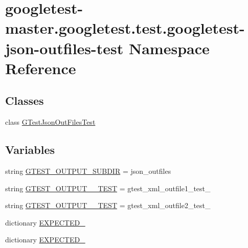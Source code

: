 \hypertarget{namespacegoogletest-master_1_1googletest_1_1test_1_1googletest-json-outfiles-test}{}\section{googletest-\/master.googletest.\+test.\+googletest-\/json-\/outfiles-\/test Namespace Reference}
\label{namespacegoogletest-master_1_1googletest_1_1test_1_1googletest-json-outfiles-test}
\subsection*{Classes}
\begin{DoxyCompactItemize}
\item 
class \mbox{\hyperlink{classgoogletest-master_1_1googletest_1_1test_1_1googletest-json-outfiles-test_1_1_g_test_json_out_files_test}{G\+Test\+Json\+Out\+Files\+Test}}
\end{DoxyCompactItemize}
\subsection*{Variables}
\begin{DoxyCompactItemize}
\item 
string \mbox{\hyperlink{namespacegoogletest-master_1_1googletest_1_1test_1_1googletest-json-outfiles-test_a10f4c8253cb86d1552a74efb44f3785a}{G\+T\+E\+S\+T\+\_\+\+O\+U\+T\+P\+U\+T\+\_\+\+S\+U\+B\+D\+IR}} = \textquotesingle{}json\+\_\+outfiles\textquotesingle{}
\item 
string \mbox{\hyperlink{namespacegoogletest-master_1_1googletest_1_1test_1_1googletest-json-outfiles-test_a5de94923f2f695f36e5fc59c11a7d3b7}{G\+T\+E\+S\+T\+\_\+\+O\+U\+T\+P\+U\+T\+\_\+\_\+\+T\+E\+ST}} = \textquotesingle{}gtest\+\_\+xml\+\_\+outfile1\+\_\+test\+\_\+\textquotesingle{}
\item 
string \mbox{\hyperlink{namespacegoogletest-master_1_1googletest_1_1test_1_1googletest-json-outfiles-test_a98cefe2abc94179eca328d3b99605593}{G\+T\+E\+S\+T\+\_\+\+O\+U\+T\+P\+U\+T\+\_\+\_\+\+T\+E\+ST}} = \textquotesingle{}gtest\+\_\+xml\+\_\+outfile2\+\_\+test\+\_\+\textquotesingle{}
\item 
dictionary \mbox{\hyperlink{namespacegoogletest-master_1_1googletest_1_1test_1_1googletest-json-outfiles-test_afe1de3ccdd67016d5bb2b0a2172fa523}{E\+X\+P\+E\+C\+T\+E\+D\+\_}}
\item 
dictionary \mbox{\hyperlink{namespacegoogletest-master_1_1googletest_1_1test_1_1googletest-json-outfiles-test_ac23e116c6b3f78f2af70a49111162ac8}{E\+X\+P\+E\+C\+T\+E\+D\+\_}}
\end{DoxyCompactItemize}


